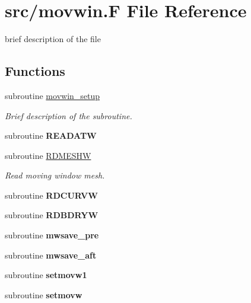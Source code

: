 \hypertarget{movwin_8F}{
\section{src/movwin.F File Reference}
\label{movwin_8F}
}
brief description of the file 

\subsection*{Functions}
\begin{CompactItemize}
\item 
subroutine \hyperlink{movwin_8F_cd12f456fef33becb50793608b263021}{movwin\_\-setup}
\begin{CompactList}\small\item\em Brief description of the subroutine. \item\end{CompactList}\item 
\hypertarget{movwin_8F_63b16d15ed4231f8ed49f6a75e16c221}{
subroutine \textbf{READATW}}
\label{movwin_8F_63b16d15ed4231f8ed49f6a75e16c221}

\item 
subroutine \hyperlink{movwin_8F_da38f8a5d8e3a060270b20f61e8a2a48}{RDMESHW}
\begin{CompactList}\small\item\em Read moving window mesh. \item\end{CompactList}\item 
\hypertarget{movwin_8F_2da250c6136b722a97d89974bdf28ab9}{
subroutine \textbf{RDCURVW}}
\label{movwin_8F_2da250c6136b722a97d89974bdf28ab9}

\item 
\hypertarget{movwin_8F_58d1c11383809a3d07d365b2329b5b1a}{
subroutine \textbf{RDBDRYW}}
\label{movwin_8F_58d1c11383809a3d07d365b2329b5b1a}

\item 
\hypertarget{movwin_8F_677f91d6861068c0dc712b562853de67}{
subroutine \textbf{mwsave\_\-pre}}
\label{movwin_8F_677f91d6861068c0dc712b562853de67}

\item 
\hypertarget{movwin_8F_9ce9d20f3f85983b1f68d638fc2491d9}{
subroutine \textbf{mwsave\_\-aft}}
\label{movwin_8F_9ce9d20f3f85983b1f68d638fc2491d9}

\item 
\hypertarget{movwin_8F_b55c5b191326094f71646851e633896c}{
subroutine \textbf{setmovw1}}
\label{movwin_8F_b55c5b191326094f71646851e633896c}

\item 
\hypertarget{movwin_8F_804cf31aea8ce2fdda3b347954eafaad}{
subroutine \textbf{setmovw}}
\label{movwin_8F_804cf31aea8ce2fdda3b347954eafaad}

\end{CompactItemize}


